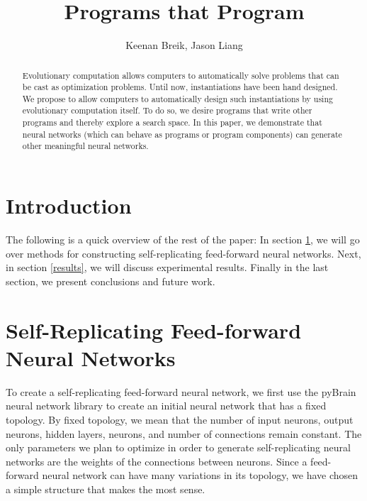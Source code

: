 \documentclass[12pt]{article}
\begin{document}
\title{Programs that Program}

\author{Keenan Breik, Jason Liang}
\date{}
\maketitle

\begin{abstract}
Evolutionary computation allows computers to automatically solve problems that can be cast as optimization problems. Until now, instantiations have been hand designed. We propose to allow computers to automatically design such instantiations by using evolutionary computation itself. To do so, we desire programs that write other programs and thereby explore a search space. In this paper, we demonstrate that neural networks (which can behave as programs or program components) can generate other meaningful neural networks.
\end{abstract}

\section*{Introduction}

The following is a quick overview of the rest of the paper: In section \ref{feedforward}, we will go over methods for constructing self-replicating feed-forward neural networks. Next, in section \ref{results}, we will discuss experimental results. Finally in the last section, we present conclusions and future work.

\section{Self-Replicating Feed-forward Neural Networks} \label{feedforward}

To create a self-replicating feed-forward neural network, we first use the pyBrain neural network library \cite{schaul2010} to create an initial neural network that has a fixed topology. By fixed topology, we mean that the number of input neurons, output neurons, hidden layers, neurons, and number of connections remain constant. The only parameters we plan to optimize in order to generate self-replicating neural networks are  the weights of the connections between neurons. Since a feed-forward neural network can have many variations in its topology, we have chosen a simple structure that makes the most sense. 
\end{document}

